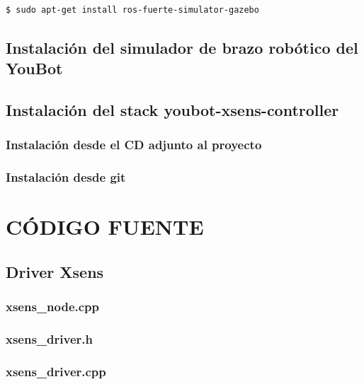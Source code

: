 \documentclass[12pt, a4paper]{report}
\begin{document}
\begin{verbatim}
$ sudo apt-get install ros-fuerte-simulator-gazebo
\end{verbatim}

\section{Instalación del simulador de brazo robótico del YouBot}



\section{Instalación del stack youbot-xsens-controller}



\subsection{Instalación desde el CD adjunto al proyecto}

\subsection{Instalación desde git}

\iffalse

\chapter{CÓDIGO FUENTE}

\section{Driver Xsens}

\subsection{xsens\_node.cpp}
\lstset{inputencoding=utf8/latin1}

\newpage

\subsection{xsens\_driver.h}
\lstset{inputencoding=utf8/latin1}

\newpage

\subsection{xsens\_driver.cpp}
\lstset{inputencoding=utf8/latin1}

\newpage
\end{document}
